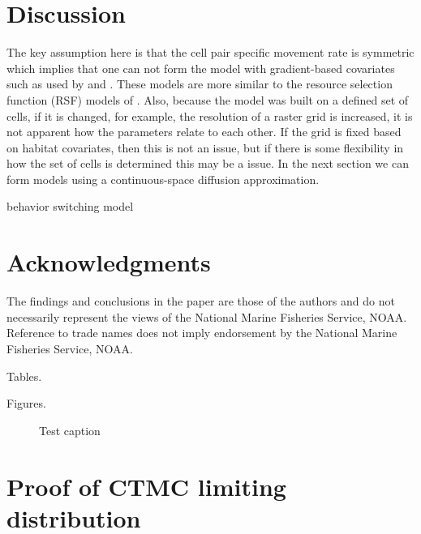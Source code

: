 \documentclass[12pt]{article}
\begin{document}
\section{Discussion}


The key assumption here is that the cell pair specific movement rate is symmetric which implies that one can not form the model with gradient-based covariates such as used by \cite{Hanks:2015aa} and \cite{wilsonestimating}. These models are more similar to the resource selection function (RSF) models of \cite{Johnson:2008kx, Johnson:2013fk}. Also, because the model was built on a defined set of cells, if it is changed, for example, the resolution of a raster grid is increased, it is not apparent how the parameters relate to each other. If the grid is fixed based on habitat covariates, then this is not an issue, but if there is some flexibility in how the set of cells is determined this may be a issue. In the next section we can form models using a continuous-space diffusion approximation. 

behavior switching model



\section*{Acknowledgments}
The findings and conclusions in the paper are those of the authors and do not necessarily represent the views of the National Marine Fisheries Service, NOAA. Reference to trade names does not imply endorsement by the National Marine Fisheries Service, NOAA.




\clearpage

Tables.

\clearpage

Figures.

\begin{figure}
\caption{Test caption}
\end{figure}


\clearpage

\appendix 

\section{Proof of CTMC limiting distribution}
\end{document}
